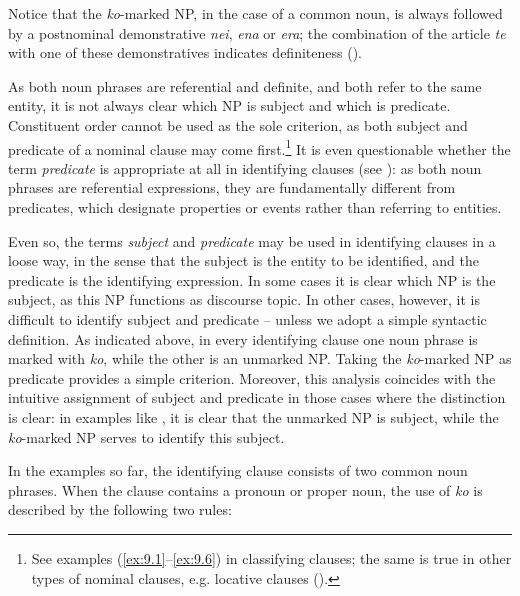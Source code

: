 Notice that the \textit{ko}{}-marked NP, in the case of a common noun, is always followed by a postnominal demonstrative \textit{nei}, \textit{ena} or \textit{era}; the combination of the article \textit{te} with one of these demonstratives indicates definiteness ().

As both noun phrases are referential and definite, and both refer to the same entity, it is not always clear which NP is subject and which is predicate. Constituent order cannot be used as the sole criterion, as both subject and predicate of a nominal clause may come first.\footnote{\label{fn:461}See examples (\ref{ex:9.1}–\ref{ex:9.6}) in classifying clauses; the same is true in other types of nominal clauses, e.g. locative clauses ().} It is even questionable whether the term \textit{predicate} is appropriate at all in identifying clauses (see \citealt[440]{Anderson2004}): as both noun phrases are referential expressions, they are fundamentally different from predicates, which designate properties or events rather than referring to entities. 

Even so, the terms \textit{subject} and \textit{predicate} may be used in identifying clauses in a loose way, in the sense that the subject is the entity to be identified, and the predicate is the identifying expression. In some cases it is clear which NP is the subject, as this NP functions as discourse topic. In other cases, however, it is difficult to identify subject and predicate – unless we adopt a simple syntactic definition. As indicated above, in every identifying clause one noun phrase is marked with \textit{ko}, while the other is an unmarked NP. Taking the \textit{ko}{}-marked NP as predicate provides a simple criterion. Moreover, this analysis coincides with the intuitive assignment of subject and predicate in those cases where the distinction is clear: in examples like , it is clear that the unmarked NP is subject, while the \textit{ko}-marked NP serves to identify this subject.

In the examples so far, the identifying clause consists of two common noun phrases. When the clause contains a pronoun or proper noun, the use of \textit{ko} is described by the following two rules:

